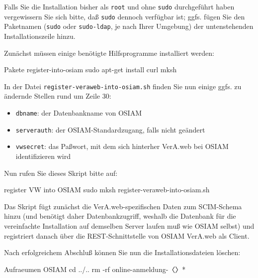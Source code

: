 Falls Sie die Installation bisher als \texttt{root} und ohne
\texttt{sudo} durchgeführt haben vergewissern Sie sich bitte,
daß \texttt{sudo} dennoch verfügbar ist; ggfs. fügen Sie den
Paketnamen (\texttt{sudo} oder \texttt{sudo-ldap}, je nach
Ihrer Umgebung) der untenstehenden Installationszeile hinzu.

\begin{minipage}{\textwidth}
Zunächst müssen einige benötigte Hilfsprogramme installiert werden:

\begin{lstdump}{Pakete register-into-osiam}
sudo apt-get install curl mksh
\end{lstdump}
\end{minipage}

In der Datei \texttt{register-veraweb-into-osiam.sh} finden
Sie nun einige ggfs. zu ändernde Stellen rund um Zeile 30:
\keinumbruch

\begin{itemize}
 \item{\texttt{dbname}: der Datenbankname von OSIAM}
 \item{\texttt{serverauth}: der OSIAM-Standardzugang,
  falls nicht geändert}
 \item{\texttt{vwsecret}: das Paßwort, mit dem sich
  hinterher VerA.web bei OSIAM identifizieren wird}
\end{itemize}

\begin{minipage}{\textwidth}
Nun rufen Sie dieses Skript bitte auf:

\begin{lstdump}{register VW into OSIAM}
sudo mksh register-veraweb-into-osiam.sh
\end{lstdump}
\end{minipage}

Das Skript fügt zunächst die VerA.web-spezifischen Daten
zum SCIM-Schema hinzu (und benötigt daher Datenbankzugriff,
weshalb die Datenbank für die vereinfachte Installation
auf demselben Server laufen muß wie OSIAM selbst) und
registriert danach über die REST-Schnittstelle von OSIAM
VerA.web als Client.

\begin{minipage}{\textwidth}
Nach erfolgreichem Abschluß können Sie nun die
Installationsdateien löschen:

\begin{lstdump}{Aufraeumen OSIAM}
cd ../..
rm -rf online-anmeldung-〈\lstdumpesc{\vwiaverssw}〉*
\end{lstdump}
\end{minipage}

